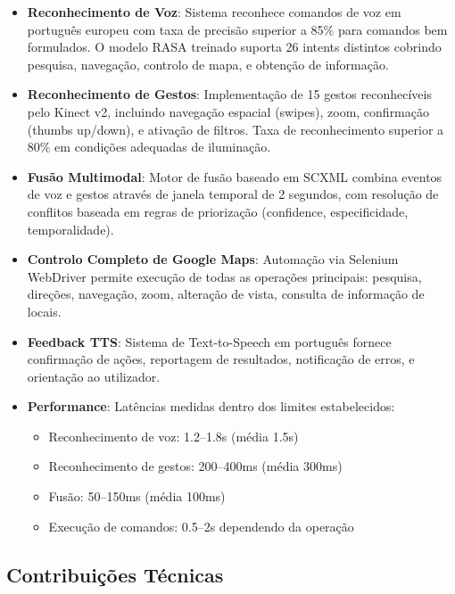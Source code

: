 \begin{itemize}
    \item \textbf{Reconhecimento de Voz}: Sistema reconhece comandos de voz em português europeu com taxa de precisão superior a 85\% para comandos bem formulados. O modelo RASA treinado suporta 26 intents distintos cobrindo pesquisa, navegação, controlo de mapa, e obtenção de informação.

    \item \textbf{Reconhecimento de Gestos}: Implementação de 15 gestos reconhecíveis pelo Kinect v2, incluindo navegação espacial (swipes), zoom, confirmação (thumbs up/down), e ativação de filtros. Taxa de reconhecimento superior a 80\% em condições adequadas de iluminação.

    \item \textbf{Fusão Multimodal}: Motor de fusão baseado em SCXML combina eventos de voz e gestos através de janela temporal de 2 segundos, com resolução de conflitos baseada em regras de priorização (confidence, especificidade, temporalidade).

    \item \textbf{Controlo Completo de Google Maps}: Automação via Selenium WebDriver permite execução de todas as operações principais: pesquisa, direções, navegação, zoom, alteração de vista, consulta de informação de locais.

    \item \textbf{Feedback TTS}: Sistema de Text-to-Speech em português fornece confirmação de ações, reportagem de resultados, notificação de erros, e orientação ao utilizador.

    \item \textbf{Performance}: Latências medidas dentro dos limites estabelecidos:
    \begin{itemize}
        \item Reconhecimento de voz: 1.2--1.8s (média 1.5s)
        \item Reconhecimento de gestos: 200--400ms (média 300ms)
        \item Fusão: 50--150ms (média 100ms)
        \item Execução de comandos: 0.5--2s dependendo da operação
    \end{itemize}
\end{itemize}

\subsection{Contribuições Técnicas}

